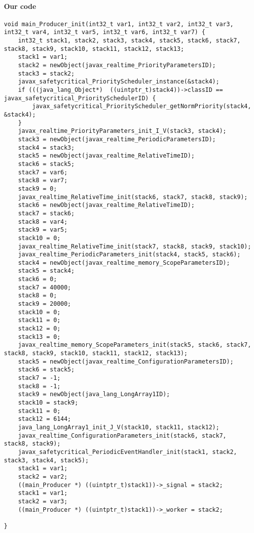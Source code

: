 \begin{landscape}
\begin{multicols}{2}
\paragraph{Our code}\hfill
\begin{lstlisting}[firstnumber=281]
void main_Producer_init(int32_t var1, int32_t var2, int32_t var3, int32_t var4, int32_t var5, int32_t var6, int32_t var7) {
	int32_t stack1, stack2, stack3, stack4, stack5, stack6, stack7, stack8, stack9, stack10, stack11, stack12, stack13;
	stack1 = var1;
	stack2 = newObject(javax_realtime_PriorityParametersID);
	stack3 = stack2;
	javax_safetycritical_PriorityScheduler_instance(&stack4);
	if (((java_lang_Object*)  ((uintptr_t)stack4))->classID == javax_safetycritical_PrioritySchedulerID) {
		javax_safetycritical_PriorityScheduler_getNormPriority(stack4, &stack4);
	}
	javax_realtime_PriorityParameters_init_I_V(stack3, stack4);
	stack3 = newObject(javax_realtime_PeriodicParametersID);
	stack4 = stack3;
	stack5 = newObject(javax_realtime_RelativeTimeID);
	stack6 = stack5;
	stack7 = var6;
	stack8 = var7;
	stack9 = 0;
	javax_realtime_RelativeTime_init(stack6, stack7, stack8, stack9);
	stack6 = newObject(javax_realtime_RelativeTimeID);
	stack7 = stack6;
	stack8 = var4;
	stack9 = var5;
	stack10 = 0;
	javax_realtime_RelativeTime_init(stack7, stack8, stack9, stack10);
	javax_realtime_PeriodicParameters_init(stack4, stack5, stack6);
	stack4 = newObject(javax_realtime_memory_ScopeParametersID);
	stack5 = stack4;
	stack6 = 0;
	stack7 = 40000;
	stack8 = 0;
	stack9 = 20000;
	stack10 = 0;
	stack11 = 0;
	stack12 = 0;
	stack13 = 0;
	javax_realtime_memory_ScopeParameters_init(stack5, stack6, stack7, stack8, stack9, stack10, stack11, stack12, stack13);
	stack5 = newObject(javax_realtime_ConfigurationParametersID);
	stack6 = stack5;
	stack7 = -1;
	stack8 = -1;
	stack9 = newObject(java_lang_LongArray1ID);
	stack10 = stack9;
	stack11 = 0;
	stack12 = 6144;
	java_lang_LongArray1_init_J_V(stack10, stack11, stack12);
	javax_realtime_ConfigurationParameters_init(stack6, stack7, stack8, stack9);
	javax_safetycritical_PeriodicEventHandler_init(stack1, stack2, stack3, stack4, stack5);
	stack1 = var1;
	stack2 = var2;
	((main_Producer *) ((uintptr_t)stack1))->_signal = stack2;
	stack1 = var1;
	stack2 = var3;
	((main_Producer *) ((uintptr_t)stack1))->_worker = stack2;

}
\end{lstlisting}


\end{multicols}
\end{landscape}
